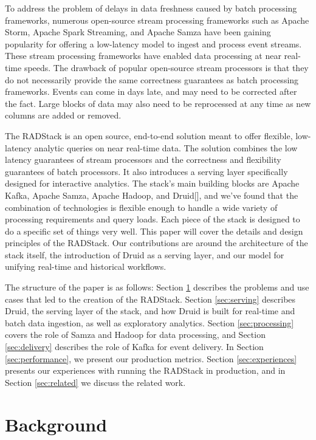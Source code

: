 \documentclass{vldb}
\begin{document}
To address the problem of delays in data freshness caused by batch processing
frameworks, numerous open-source stream processing frameworks such as Apache
Storm\cite{marz2013storm}, Apache Spark Streaming\cite{zaharia2012discretized},
and Apache Samza\cite{2014samza} have been gaining popularity for offering a
low-latency model to ingest and process event streams. These stream processing
frameworks have enabled data processing at near real-time speeds. The drawback
of popular open-source stream processors is that they do not necessarily
provide the same correctness guarantees as batch processing frameworks. Events
can come in days late, and may need to be corrected after the fact. Large
blocks of data may also need to be reprocessed at any time as new columns are
added or removed.
 
The RADStack is an open source, end-to-end solution meant to offer flexible,
low-latency analytic queries on near real-time data. The solution combines the
low latency guarantees of stream processors and the correctness and flexibility
guarantees of batch processors. It also introduces a serving layer specifically
designed for interactive analytics. The stack’s main building blocks are Apache
Kafka\cite{kreps2011kafka}, Apache Samza, Apache Hadoop, and Druid[], and we’ve
found that the combination of technologies is flexible enough to handle a wide
variety of processing requirements and query loads. Each piece of the stack is
designed to do a specific set of things very well. This paper will cover the
details and design principles of the RADStack. Our contributions are around the
architecture of the stack itself, the introduction of Druid as a serving layer,
and our model for unifying real-time and historical workflows.
 
The structure of the paper is as follows: Section \ref{sec:background}
describes the problems and use cases that led to the creation of the RADStack.
Section \ref{sec:serving} describes Druid, the serving layer of the stack, and
how Druid is built for real-time and batch data ingestion, as well as
exploratory analytics. Section \ref{sec:processing} covers the role of Samza
and Hadoop for data processing, and Section \ref{sec:delivery} describes the
role of Kafka for event delivery. In Section \ref{sec:performance}, we present
our production metrics.  Section \ref{sec:experiences} presents our experiences
with running the RADStack in production, and in Section \ref{sec:related} we
discuss the related work.

\section{Background}
\label{sec:background}
\end{document}
